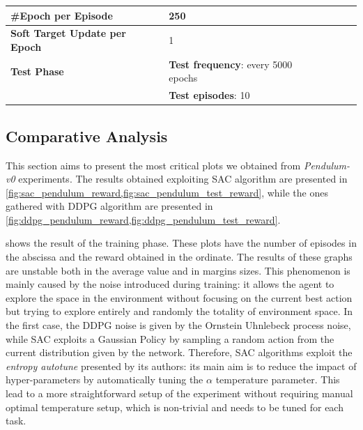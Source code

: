 \begin{table}[!h]
{\begin{tabular}{@{}lllll@{}}
			\textbf{\#Epoch per Episode}          & 250                                                    \\\midrule
			\textbf{Soft Target Update per Epoch} & 1                                                      \\\midrule
			\textbf{Test Phase}                   & \textbf{Test frequency}: every 5000 epochs             \\
			                                      & \textbf{Test episodes}: 10                             \\
			\bottomrule
		\end{tabular}}
\end{table}

\FloatBarrier

\subsection{Comparative Analysis}

This section aims to present the most critical plots we obtained from \textit{Pendulum-v0} experiments.
The results obtained exploiting SAC algorithm are presented in \vref{fig:sac_pendulum_reward,fig:sac_pendulum_test_reward}, while the ones gathered with DDPG algorithm are presented in \vref{fig:ddpg_pendulum_reward,fig:ddpg_pendulum_test_reward}.

 shows the result of the training phase.
These plots have the number of episodes in the abscissa and the reward obtained in the ordinate.
The results of these graphs are unstable both in the average value and in margins sizes.
This phenomenon is mainly caused by the noise introduced during training: it allows the agent to explore the space in the environment without focusing on the current best action but trying to explore entirely and randomly the totality of environment space.
In the first case, the DDPG noise is given by the Ornstein Uhnlebeck process noise, while SAC exploits a Gaussian Policy by sampling a random action from the current distribution given by the network.
Therefore, SAC algorithms exploit the \textit{entropy autotune} presented by its authors: its main aim is to reduce the impact of hyper-parameters by automatically tuning the $\alpha$ temperature parameter.
This lead to a more straightforward setup of the experiment without requiring manual optimal temperature setup, which is non-trivial and needs to be tuned for each task.

